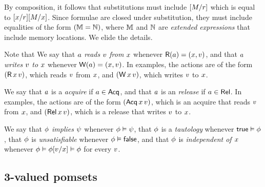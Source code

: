 By composition, it follows that substitutions must include $[M/r]$
which is equal to $[x/r][M/x]$.  Since formulae are closed
under substitution, they must include equalities of the form
$(\mathbb{M}=\mathbb{N})$, where $\mathbb{M}$ and $\mathbb{N}$ are \emph{extended
  expressions} that include memory locations.  We elide the details.

Note that 
We say that $a$ \emph{reads} $v$ \emph{from} $x$ whenever
$\mathsf{R}(a) = (x,v)$, and that $a$ \emph{writes} $v$
\emph{to} $x$ whenever $\mathsf{W}(a) = (x,v)$.  In examples,
the actions are of the form $(\DR{\aLoc}{\aVal})$, which reads $v$ from
$x$, and $(\DW{\aLoc}{\aVal})$, which writes $v$ to $x$.

We say that $a$ is a \emph{acquire} if $a\in\mathsf{Acq}$, and that $a$
is an \emph{release} if $a\in\mathsf{Rel}$.  In examples, the actions are of the
form $(\DRAcq{\aLoc}{\aVal})$, which is an acquire that reads $v$ from
$x$, and $(\DWRel{\aLoc}{\aVal})$, which is a release that writes $v$
to $x$.

We say that $\phi$ \emph{implies} $\psi$ whenever $\phi\vDash\psi$,
that $\phi$ is a \emph{tautology} whenever $\mathsf{true}\vDash\phi$, that
$\phi$ is \emph{unsatisfiable} whenever $\phi\vDash\mathsf{false}$, and that
$\phi$ is \emph{independent of $x$} whenever
$\phi \vDash \phi[v/x] \vDash \phi$ for every $v$.


\subsection{3-valued pomsets}
\label{sec:semi:pomsets}

